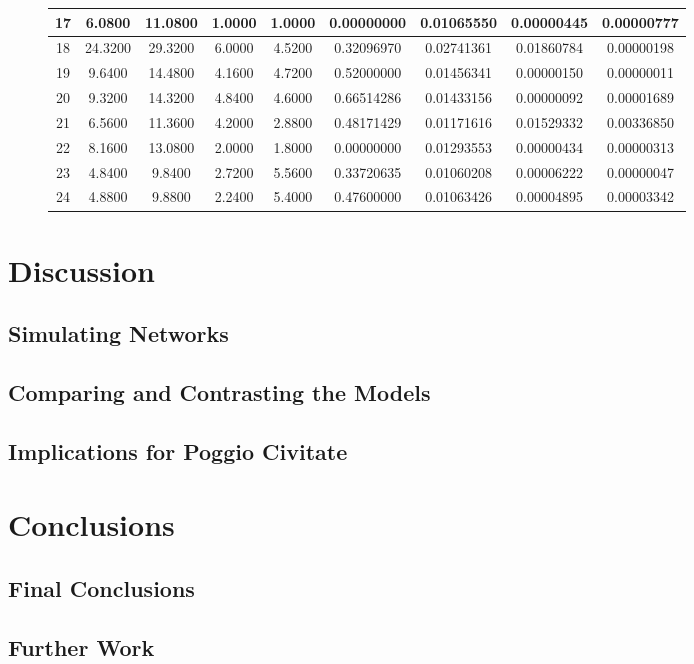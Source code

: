 \documentclass[12pt,a4paper]{thesis}
\begin{document}
\begin{figure}[H]
\begin{tabular}{|c|c|c|c|c|c|c|c|c|}
\hline	17	&	6.0800	&	11.0800	&	1.0000	&	1.0000	&	0.00000000	&	0.01065550	&	0.00000445	&	0.00000777	\\
\hline	18	&	24.3200	&	29.3200	&	6.0000	&	4.5200	&	0.32096970	&	0.02741361	&	0.01860784	&	0.00000198	\\
\hline	19	&	9.6400	&	14.4800	&	4.1600	&	4.7200	&	0.52000000	&	0.01456341	&	0.00000150	&	0.00000011	\\
\hline	20	&	9.3200	&	14.3200	&	4.8400	&	4.6000	&	0.66514286	&	0.01433156	&	0.00000092	&	0.00001689	\\
\hline	21	&	6.5600	&	11.3600	&	4.2000	&	2.8800	&	0.48171429	&	0.01171616	&	0.01529332	&	0.00336850	\\
\hline	22	&	8.1600	&	13.0800	&	2.0000	&	1.8000	&	0.00000000	&	0.01293553	&	0.00000434	&	0.00000313	\\
\hline	23	&	4.8400	&	9.8400	&	2.7200	&	5.5600	&	0.33720635	&	0.01060208	&	0.00006222	&	0.00000047	\\
\hline	24	&	4.8800	&	9.8800	&	2.2400	&	5.4000	&	0.47600000	&	0.01063426	&	0.00004895	&	0.00003342	\\
\hline
\end{tabular} 
\end{figure}

\chapter{Discussion}
\section{Simulating Networks}
\section{Comparing and Contrasting the Models}
\section{Implications for Poggio Civitate}

\chapter{Conclusions}
\section{Final Conclusions}
\section{Further Work}
\end{document}
